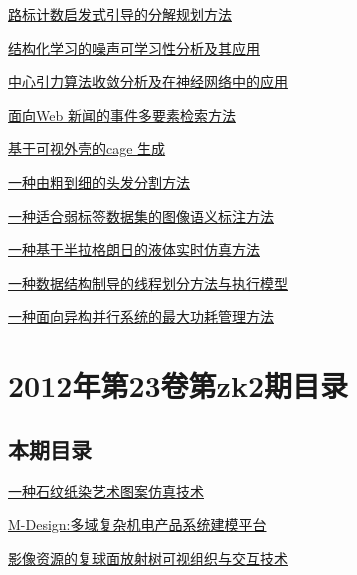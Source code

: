 \documentclass[a4paper]{article}
\begin{document}
\href{http://www.jos.org.cn/ch/reader/download_pdf.aspx?file_no=4383&year_id=2013&quarter_id=10&falg=1}{路标计数启发式引导的分解规划方法}

\href{http://www.jos.org.cn/ch/reader/download_pdf.aspx?file_no=4393&year_id=2013&quarter_id=10&falg=1}{结构化学习的噪声可学习性分析及其应用}

\href{http://www.jos.org.cn/ch/reader/download_pdf.aspx?file_no=4391&year_id=2013&quarter_id=10&falg=1}{中心引力算法收敛分析及在神经网络中的应用}

\href{http://www.jos.org.cn/ch/reader/download_pdf.aspx?file_no=4382&year_id=2013&quarter_id=10&falg=1}{面向Web 新闻的事件多要素检索方法}

\href{http://www.jos.org.cn/ch/reader/download_pdf.aspx?file_no=4413&year_id=2013&quarter_id=10&falg=1}{基于可视外壳的cage 生成}

\href{http://www.jos.org.cn/ch/reader/download_pdf.aspx?file_no=4423&year_id=2013&quarter_id=10&falg=1}{一种由粗到细的头发分割方法}

\href{http://www.jos.org.cn/ch/reader/download_pdf.aspx?file_no=4424&year_id=2013&quarter_id=10&falg=1}{一种适合弱标签数据集的图像语义标注方法}

\href{http://www.jos.org.cn/ch/reader/download_pdf.aspx?file_no=4436&year_id=2013&quarter_id=10&falg=1}{一种基于半拉格朗日的液体实时仿真方法}

\href{http://www.jos.org.cn/ch/reader/download_pdf.aspx?file_no=4353&year_id=2013&quarter_id=10&falg=1}{一种数据结构制导的线程划分方法与执行模型}

\href{http://www.jos.org.cn/ch/reader/download_pdf.aspx?file_no=4357&year_id=2013&quarter_id=10&falg=1}{一种面向异构并行系统的最大功耗管理方法}


\section{\textbf{2012年第23卷第zk2期目录}}
\subsection{本期目录}
\href{http://www.jos.org.cn/ch/reader/download_pdf.aspx?file_no=12019&year_id=2012&quarter_id=zk2&falg=1}{一种石纹纸染艺术图案仿真技术}

\href{http://www.jos.org.cn/ch/reader/download_pdf.aspx?file_no=12020&year_id=2012&quarter_id=zk2&falg=1}{M-Design:多域复杂机电产品系统建模平台}

\href{http://www.jos.org.cn/ch/reader/download_pdf.aspx?file_no=12021&year_id=2012&quarter_id=zk2&falg=1}{影像资源的复球面放射树可视组织与交互技术}
\end{document}
